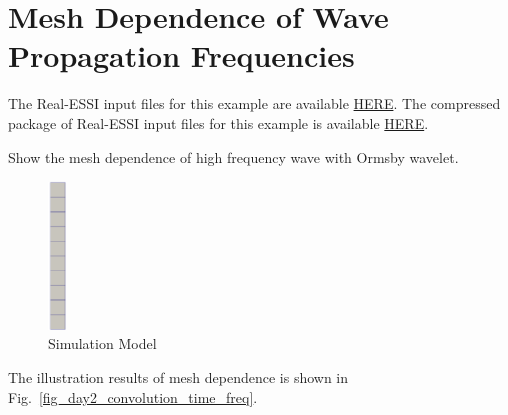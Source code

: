 \clearpage
\newpage
\section{Mesh Dependence of Wave Propagation Frequencies}
\label{Convolution_Motions}


The Real-ESSI input files for this example are available 
\href{https://github.com/yuan-energy/Real-ESSI-Short-Course-Examples/tree/master/short-course-examples/Day2/Convolution_Motions}{HERE}. 
The compressed package of Real-ESSI input files for this example is available 
\href{https://github.com/yuan-energy/Real-ESSI-Short-Course-Examples/blob/master/short-course-examples/Day2/Convolution_Motions/Convolution_Motions.tgz?raw=true}{HERE}. 


Show the mesh dependence of high frequency wave with Ormsby wavelet.

\begin{figure}[H]
  \centering
  \includegraphics[width = 0.5cm]{./Figure-files/Day2/Convolution_Motions/overview.png}
  \caption{Simulation Model}
  \label{fig_decon_1D_motion_3D_model4}
\end{figure}

The illustration results of mesh dependence is shown in Fig.~\ref{fig_day2_convolution_time_freq}.

